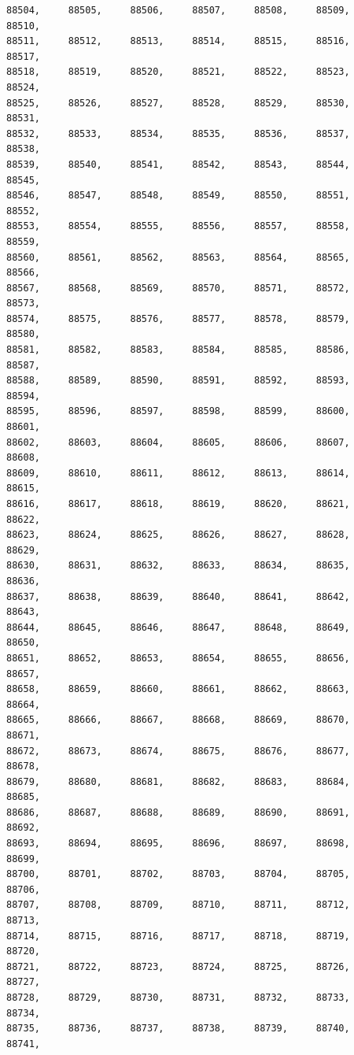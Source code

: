 \documentclass[a4paper,11pt]{report}
\begin{document}
\begin{verbatim}
88504,     88505,     88506,     88507,     88508,     88509,     88510,     
88511,     88512,     88513,     88514,     88515,     88516,     88517,     
88518,     88519,     88520,     88521,     88522,     88523,     88524,     
88525,     88526,     88527,     88528,     88529,     88530,     88531,     
88532,     88533,     88534,     88535,     88536,     88537,     88538,     
88539,     88540,     88541,     88542,     88543,     88544,     88545,     
88546,     88547,     88548,     88549,     88550,     88551,     88552,     
88553,     88554,     88555,     88556,     88557,     88558,     88559,     
88560,     88561,     88562,     88563,     88564,     88565,     88566,     
88567,     88568,     88569,     88570,     88571,     88572,     88573,     
88574,     88575,     88576,     88577,     88578,     88579,     88580,     
88581,     88582,     88583,     88584,     88585,     88586,     88587,     
88588,     88589,     88590,     88591,     88592,     88593,     88594,     
88595,     88596,     88597,     88598,     88599,     88600,     88601,     
88602,     88603,     88604,     88605,     88606,     88607,     88608,     
88609,     88610,     88611,     88612,     88613,     88614,     88615,     
88616,     88617,     88618,     88619,     88620,     88621,     88622,     
88623,     88624,     88625,     88626,     88627,     88628,     88629,     
88630,     88631,     88632,     88633,     88634,     88635,     88636,     
88637,     88638,     88639,     88640,     88641,     88642,     88643,     
88644,     88645,     88646,     88647,     88648,     88649,     88650,     
88651,     88652,     88653,     88654,     88655,     88656,     88657,     
88658,     88659,     88660,     88661,     88662,     88663,     88664,     
88665,     88666,     88667,     88668,     88669,     88670,     88671,     
88672,     88673,     88674,     88675,     88676,     88677,     88678,     
88679,     88680,     88681,     88682,     88683,     88684,     88685,     
88686,     88687,     88688,     88689,     88690,     88691,     88692,     
88693,     88694,     88695,     88696,     88697,     88698,     88699,     
88700,     88701,     88702,     88703,     88704,     88705,     88706,     
88707,     88708,     88709,     88710,     88711,     88712,     88713,     
88714,     88715,     88716,     88717,     88718,     88719,     88720,     
88721,     88722,     88723,     88724,     88725,     88726,     88727,     
88728,     88729,     88730,     88731,     88732,     88733,     88734,     
88735,     88736,     88737,     88738,     88739,     88740,     88741,     

\end{verbatim}
\end{document}
